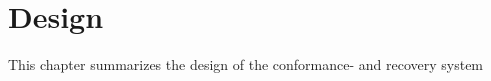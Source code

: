 \chapter{Design}
\label{chapter:Design}
This chapter summarizes the design of the conformance- and  recovery system 